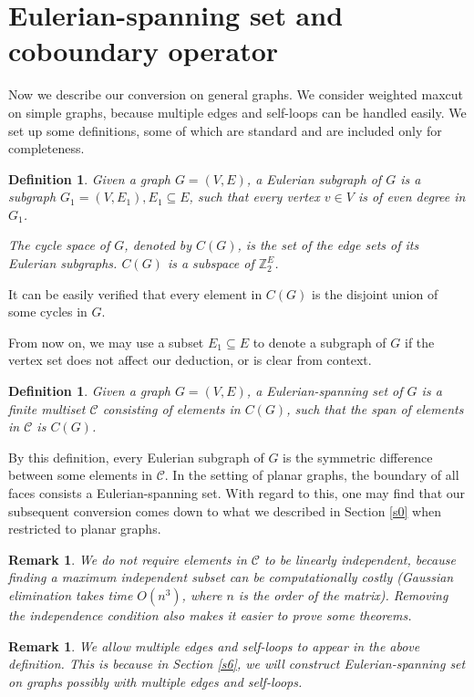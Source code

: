 \documentclass[10pt,fleqn]{article}
\newtheorem{definition}[theorem]{Definition}
\newtheorem{remark}[theorem]{Remark}
\newcommand{\Z}{\mathbb{Z}}
\newcommand{\mc}[1]{\mathcal{#1}}
\begin{document}
	\section{Eulerian-spanning set and coboundary operator}\label{s2}
	Now we describe our conversion on general graphs. We consider weighted maxcut on simple graphs, because multiple edges and self-loops can be handled easily. We set up some definitions, some of which are standard and are included only for completeness.
	\begin{definition}\label{def22}
		Given a graph $G=(V,E)$, a Eulerian subgraph of $G$ is a subgraph $G_1=(V,E_1),E_1\subseteq E$, such that every vertex $v\in V$ is of even degree in $G_1$. \par
		The cycle space of $G$, denoted by $C(G)$, is the set of the edge sets of its Eulerian subgraphs. $C(G)$ is a subspace of $\Z_2^E$.
	\end{definition} \par
	It can be easily verified that every element in $C(G)$ is the disjoint union of some cycles in $G$. \par
	From now on, we may use a subset $E_1\subseteq E$ to denote a subgraph of $G$ if the vertex set does not affect our deduction, or is clear from context.
	\begin{definition}\label{def23}
		Given a graph $G=(V,E)$, a Eulerian-spanning set of $G$ is a finite multiset $\mc{C}$ consisting of elements in $C(G)$, such that the span of elements in $\mc{C}$ is $C(G)$.
	\end{definition} \par
	By this definition, every Eulerian subgraph of $G$ is the symmetric difference between some elements in $\mc{C}$. In the setting of planar graphs, the boundary of all faces consists a Eulerian-spanning set. With regard to this, one may find that our subsequent conversion comes down to what we described in Section \ref{s0} when restricted to planar graphs.
	\begin{remark}
		We do not require elements in $\mc{C}$ to be linearly independent, because finding a maximum independent subset can be computationally costly (Gaussian elimination takes time $O(n^3)$, where $n$ is the order of the matrix). Removing the independence condition also makes it easier to prove some theorems. \par
	\end{remark}
	\begin{remark}
		We allow multiple edges and self-loops to appear in the above definition. This is because in Section \ref{s6}, we will construct Eulerian-spanning set on graphs possibly with multiple edges and self-loops.
	\end{remark}
\end{document}
